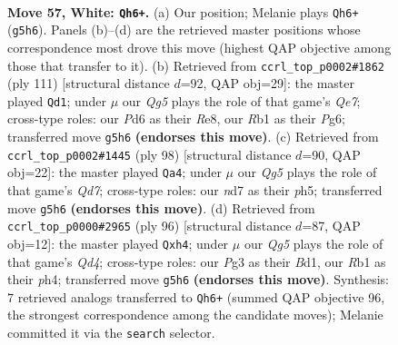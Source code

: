 \documentclass[11pt]{article}
\begin{document}
\clearpage

\begin{figure}[p]\centering
\begin{subfigure}{0.46\textwidth}\centering
\resizebox{\linewidth}{!}{%
\newchessgame
\chessboard[
  setfen={3q1k2/3n1p2/b2P1n2/6Q1/p1p4P/2B2pP1/P6K/1R6 w - - 14 57},
  showmover=false,
  pgfstyle=straightmove, color=movearrow, markmove={g5-h6}
]}
\caption{}
\end{subfigure}\hfill
\begin{subfigure}{0.46\textwidth}\centering
\resizebox{\linewidth}{!}{%
\newchessgame
\chessboard[
  setfen={4r1k1/5p2/6pp/1pPP4/6P1/1NQ1p2P/KR2q3/8 b - - 1 56},
  showmover=false,
  pgfstyle=straightmove, color=movearrow, markmove={e2-d1}
]}
\caption{}
\end{subfigure}
\\[4pt]
\begin{subfigure}{0.46\textwidth}\centering
\resizebox{\linewidth}{!}{%
\newchessgame
\chessboard[
  setfen={8/3Q2nk/5qp1/2pP3p/8/7P/2p3P1/4R2K w - - 0 50},
  showmover=false,
  pgfstyle=straightmove, color=movearrow, markmove={d7-a4}
]}
\caption{}
\end{subfigure}\hfill
\begin{subfigure}{0.46\textwidth}\centering
\resizebox{\linewidth}{!}{%
\newchessgame
\chessboard[
  setfen={5k2/2qn1p2/1p2p2p/8/P2Q3p/4P2P/5P2/3B1K2 w - - 0 49},
  showmover=false,
  pgfstyle=straightmove, color=movearrow, markmove={d4-h4}
]}
\caption{}
\end{subfigure}
\caption{\textbf{Move 57, White: \texttt{Qh6+}.} (a) Our position; Melanie plays \texttt{Qh6+} (\texttt{g5h6}). Panels (b)--(d) are the retrieved master positions whose correspondence most drove this move (highest QAP objective among those that transfer to it). (b) Retrieved from \texttt{ccrl\_top\_p0002\#1862} (ply 111) [structural distance $d$=92, QAP obj=29]: the master played \texttt{Qd1}; under $\mu$ our \emph{Qg5} plays the role of that game's \emph{Qe7}; cross-type roles: our \emph{P}d6 as their \emph{R}e8, our \emph{R}b1 as their \emph{P}g6; transferred move \texttt{g5h6} \textbf{(endorses this move)}. (c) Retrieved from \texttt{ccrl\_top\_p0002\#1445} (ply 98) [structural distance $d$=90, QAP obj=22]: the master played \texttt{Qa4}; under $\mu$ our \emph{Qg5} plays the role of that game's \emph{Qd7}; cross-type roles: our \emph{n}d7 as their \emph{p}h5; transferred move \texttt{g5h6} \textbf{(endorses this move)}. (d) Retrieved from \texttt{ccrl\_top\_p0000\#2965} (ply 96) [structural distance $d$=87, QAP obj=12]: the master played \texttt{Qxh4}; under $\mu$ our \emph{Qg5} plays the role of that game's \emph{Qd4}; cross-type roles: our \emph{P}g3 as their \emph{B}d1, our \emph{R}b1 as their \emph{p}h4; transferred move \texttt{g5h6} \textbf{(endorses this move)}. Synthesis: 7 retrieved analogs transferred to \texttt{Qh6+} (summed QAP objective 96, the strongest correspondence among the candidate moves); Melanie committed it via the \texttt{search} selector.}
\label{fig:thought-m112}
\end{figure}
\end{document}
